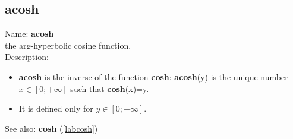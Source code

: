 \subsection{acosh}
\label{labacosh}
\noindent Name: \textbf{acosh}\\
the arg-hyperbolic cosine function.\\

\noindent Description: \begin{itemize}

\item \textbf{acosh} is the inverse of the function \textbf{cosh}: \textbf{acosh}(y) is the unique number 
   $x \in [0; +\infty]$ such that \textbf{cosh}(x)=y.

\item It is defined only for $y \in [0;+\infty]$.
\end{itemize}
See also: \textbf{cosh} (\ref{labcosh})
